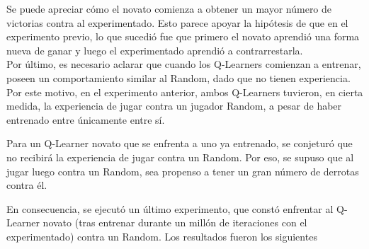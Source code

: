 Se puede apreciar cómo el novato comienza a obtener un mayor número de victorias contra al experimentado. Esto parece apoyar la hipótesis de que en el experimento previo, lo que sucedió fue que primero el novato aprendió una forma nueva de ganar y luego el experimentado aprendió a contrarrestarla.\\

Por último, es necesario aclarar que cuando los Q-Learners comienzan a entrenar, poseen un comportamiento similar al Random, dado que no tienen experiencia. Por este motivo, en el experimento anterior, ambos Q-Learners tuvieron, en cierta medida, la experiencia de jugar contra un jugador Random, a pesar de haber entrenado entre únicamente entre sí. 

Para un Q-Learner novato que se enfrenta a uno ya entrenado, se conjeturó que no recibirá la experiencia de jugar contra un Random. Por eso, se supuso que al jugar luego contra un Random, sea propenso a tener un gran número de derrotas contra él.

En consecuencia, se ejecutó un último experimento, que constó enfrentar al Q-Learner novato (tras entrenar durante un millón de iteraciones con el experimentado) contra un Random. Los resultados fueron los siguientes


